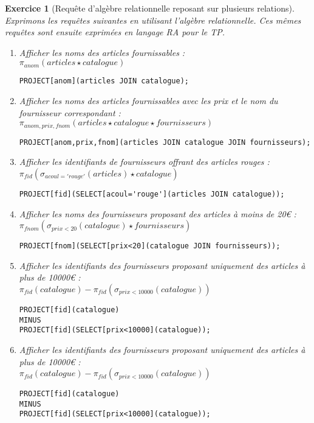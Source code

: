 \documentclass{article}
\theoremstyle{exostyle}
\newtheorem{exercice}{Exercice}
\newenvironment{questions}{

\begin{enumerate}[\hspace{12pt}\bfseries\itshape 1.]}{
\end{enumerate}

} %
\begin{document}
\begin{exercice}[Requête d'algèbre relationnelle reposant sur plusieurs relations]
Exprimons les requêtes suivantes en utilisant l'algèbre
relationnelle. Ces mêmes requêtes sont ensuite exprimées en langage RA
pour le TP.

\begin{questions}
\item Afficher les noms des articles fournissables :\\
  $\pi_{anom}(articles \star catalogue)$
\begin{verbatim}
PROJECT[anom](articles JOIN catalogue);
\end{verbatim}

\item Afficher les noms des articles fournissables avec les prix et le nom du fournisseur correspondant :\\
  $\pi_{anom,prix,fnom}(articles \star catalogue \star fournisseurs)$
\begin{verbatim}
PROJECT[anom,prix,fnom](articles JOIN catalogue JOIN fournisseurs);
\end{verbatim}

\item Afficher les identifiants de fournisseurs offrant des articles rouges :\\
  $\pi_{fid}(\sigma_{acoul='rouge'}(articles) \star catalogue)$
\begin{verbatim}
PROJECT[fid](SELECT[acoul='rouge'](articles JOIN catalogue));
\end{verbatim}

\item Afficher les noms des fournisseurs proposant des articles à moins de 20\euro{} :\\
  $\pi_{fnom}(\sigma_{prix<20}(catalogue) \star fournisseurs)$
\begin{verbatim}
PROJECT[fnom](SELECT[prix<20](catalogue JOIN fournisseurs));
\end{verbatim}

\item Afficher les identifiants des fournisseurs proposant uniquement des articles à plus de 10000\euro{} :\\
  $\pi_{fid}(catalogue) - \pi_{fid}(\sigma_{prix<10000}(catalogue))$
\begin{verbatim}
PROJECT[fid](catalogue)
MINUS
PROJECT[fid](SELECT[prix<10000](catalogue));
\end{verbatim}

\item Afficher les identifiants des fournisseurs proposant uniquement des articles à plus de 10000\euro{} :\\
  $\pi_{fid}(catalogue) - \pi_{fid}(\sigma_{prix<10000}(catalogue))$
\begin{verbatim}
PROJECT[fid](catalogue)
MINUS
PROJECT[fid](SELECT[prix<10000](catalogue));
\end{verbatim}


\end{questions}
\end{exercice}
\end{document}
